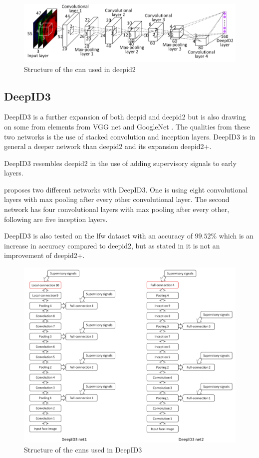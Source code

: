 \begin{figure}[h]
	\centering
	\includegraphics[width=\textwidth]{figures/deepid2_convnet}
	\caption{Structure of the \gls{cnn} used in \gls{deepid2} \citep{sun2014}}
	\label{fig:deepid2_convnet}
\end{figure}

\subsection{DeepID3}
DeepID3 is a further expansion of both \gls{deepid} and \gls{deepid2} but is also drawing on some from elements from VGG net and GoogleNet \citep{sun2015}. The qualities from these two networks is the use of stacked convolution and inception layers. DeepID3 is in general a deeper network than \gls{deepid2} and its expansion \gls{deepid2}+.

DeepID3 resembles \gls{deepid2} in the use of adding supervisory signals to early layers.

\cite{sun2015} proposes two different networks with DeepID3. One is using eight convolutional layers with max pooling after every other convolutional layer. The second network has four convolutional layers with max pooling after every other, following are five inception layers.

DeepID3 is also tested on the \gls{lfw} dataset with an accuracy of $99.52\%$ which is an increase in accuracy compared to \gls{deepid2}, but as stated in \cite{sun2015} it is not an improvement of \gls{deepid2}+.

\begin{figure}[h]
	\centering
	\includegraphics[width=\textwidth]{figures/deepid3_net}
	\caption{Structure of the \gls{cnn}s used in DeepID3 \citep{sun2015}}
	\label{fig:deepid3_net}
\end{figure}